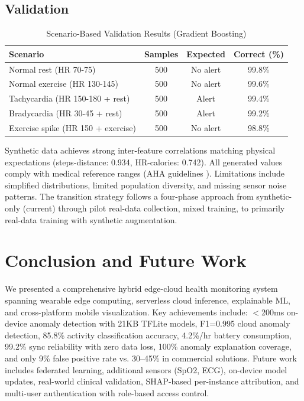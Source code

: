 \documentclass[conference]{IEEEtran}
\begin{document}
\subsection{Validation}

\begin{table}[H]
\centering
\caption{Scenario-Based Validation Results (Gradient Boosting)}
\label{tab:scenario_results}
\begin{tabular}{lccc}
\toprule
\textbf{Scenario} & \textbf{Samples} & \textbf{Expected} & \textbf{Correct (\%)} \\
\midrule
Normal rest (HR 70-75) & 500 & No alert & 99.8\% \\
Normal exercise (HR 130-145) & 500 & No alert & 99.6\% \\
Tachycardia (HR 150-180 + rest) & 500 & Alert & 99.4\% \\
Bradycardia (HR 30-45 + rest) & 500 & Alert & 99.2\% \\
Exercise spike (HR 150 + exercise) & 500 & No alert & 98.8\% \\
\bottomrule
\end{tabular}
\end{table}

Synthetic data achieves strong inter-feature correlations matching physical expectations (steps-distance: 0.934, HR-calories: 0.742). All generated values comply with medical reference ranges (AHA guidelines \cite{aha_hr}). Limitations include simplified distributions, limited population diversity, and missing sensor noise patterns. The transition strategy follows a four-phase approach from synthetic-only (current) through pilot real-data collection, mixed training, to primarily real-data training with synthetic augmentation.



\section{Conclusion and Future Work}
We presented a comprehensive hybrid edge-cloud health monitoring system spanning wearable edge computing, serverless cloud inference, explainable ML, and cross-platform mobile visualization. Key achievements include: $<$200ms on-device anomaly detection with 21KB TFLite models, F1=0.995 cloud anomaly detection, 85.8\% activity classification accuracy, 4.2\%/hr battery consumption, 99.2\% sync reliability with zero data loss, 100\% anomaly explanation coverage, and only 9\% false positive rate vs. 30--45\% in commercial solutions. Future work includes federated learning, additional sensors (SpO2, ECG), on-device model updates, real-world clinical validation, SHAP-based per-instance attribution, and multi-user authentication with role-based access control.
\end{document}
